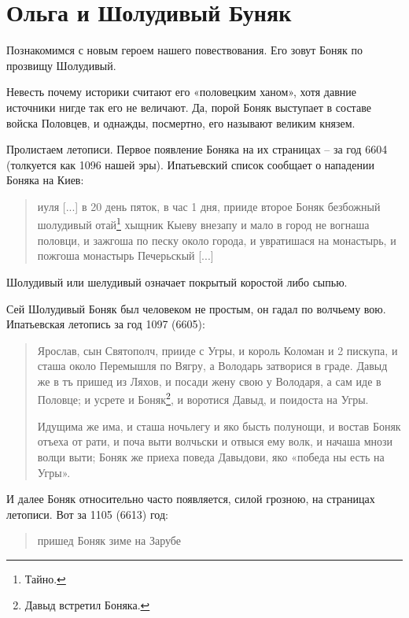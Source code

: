 \chapter{Ольга и Шолудивый Буняк}

Познакомимся с новым героем нашего повествования. Его зовут Боняк по прозвищу Шолудивый.

Невесть почему историки считают его «половецким ханом», хотя давние источники нигде так его не величают. Да, порой Боняк выступает в составе войска Половцев, и однажды, посмертно, его называют великим князем.

Пролистаем летописи. Первое появление Боняка на их страницах – за год 6604 (толкуется как 1096 нашей эры). Ипатьевский список сообщает о нападении Боняка на Киев:

\begin{quotation}
иуля [...] в 20 день пяток, в час 1 дня, прииде второе Боняк безбожный шолудивый отай\footnote{Тайно.} хыщник Кыеву внезапу и мало в город не вогнаша половци, и зажгоша по песку около города, и увратишася на монастырь, и пожгоша монастырь Печерьскый [...]
\end{quotation}

Шолудивый или шелудивый означает покрытый коростой либо сыпью.

Сей Шолудивый Боняк был человеком не простым, он гадал по волчьему вою. Ипатьевская летопись за год 1097 (6605):

\begin{quotation}
Ярослав, сын Святополч, прииде с Угры, и король Коломан и 2 пискупа, и сташа около Перемышля по Вягру, а Володарь затворися в граде. Давыд же в тъ пришед из Ляхов, и посади жену свою у Володаря, а сам иде в Половце; и усрете и Боняк\footnote{Давыд встретил Боняка.}, и воротися Давыд, и поидоста на Угры. 

Идущима же има, и сташа ночьлегу и яко бысть полунощи, и востав Боняк отъеха от рати, и поча выти волчьски и отвыся ему волк, и начаша мнози волци выти; Боняк же приеха поведа Давыдови, яко «победа ны есть на Угры».
\end{quotation}


И далее Боняк относительно часто появляется, силой грозною, на страницах летописи. Вот за 1105 (6613) год: 

\begin{quotation}
пришед Боняк зиме на Зарубе
\end{quotation}


